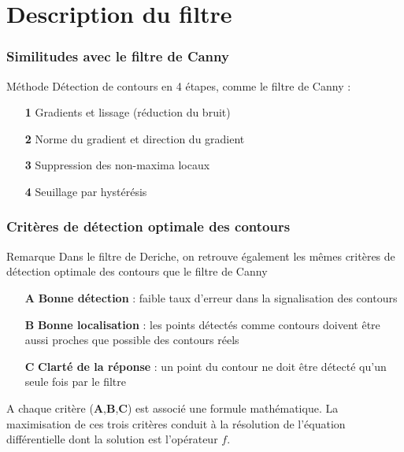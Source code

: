 \documentclass{beamer}
\begin{document}
\section{Description du filtre}
\begin{frame}
\frametitle{Similitudes avec le filtre de Canny} 

\begin{block}{Méthode}
Détection de contours en 4 étapes, comme le filtre de Canny : 
\begin{itemize}
\item[\textbf{1}] Gradients et lissage (réduction du bruit)
\item[\textbf{2}] Norme du gradient et direction du gradient
\item[\textbf{3}] Suppression des non-maxima locaux
\item[\textbf{4}] Seuillage par hystérésis
\end{itemize}
\end{block}
\end{frame}	


%

\begin{frame}
\frametitle{Critères de détection optimale des contours} 

\begin{alertblock}{Remarque}
Dans le filtre de Deriche, on retrouve également les mêmes critères de détection optimale des contours que le filtre de Canny 
\end{alertblock}

\begin{itemize}
\item[\textbf{A}] \textbf{Bonne détection} : faible taux d'erreur dans la signalisation des contours
\item[\textbf{B}] \textbf{Bonne localisation} : les points détectés comme contours doivent être aussi proches que possible des contours réels
\item[\textbf{C}] \textbf{Clarté de la réponse} : un point du contour ne doit être détecté qu'un seule fois par le filtre \\
\end{itemize}

A chaque critère (\textbf{A},\textbf{B},\textbf{C}) est associé une formule mathématique. La maximisation de ces trois critères conduit à la résolution de l'équation différentielle dont la solution est l'opérateur $ f $.

\end{frame}
\end{document}
